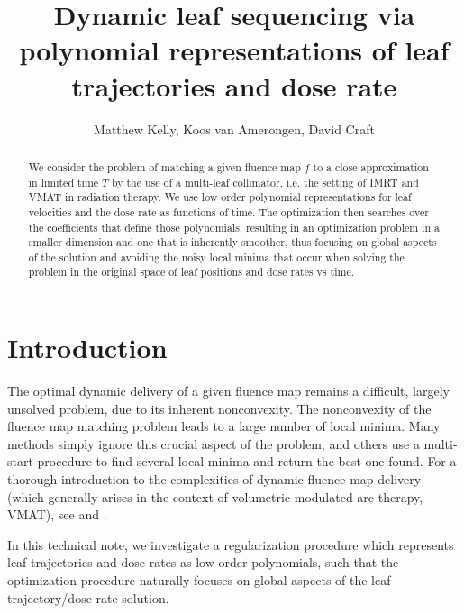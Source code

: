 \documentclass[12pt]{article}
\title{Dynamic leaf sequencing via polynomial representations of leaf trajectories and dose rate}
\author{Matthew Kelly, Koos van Amerongen, David Craft}
\affil[]{Department of Radiation Oncology, Massachusetts General Hospital, Harvard Medical School}
\begin{document}
\maketitle
\thispagestyle{empty}



\begin{abstract}
  We consider the problem of matching a given fluence map $f$ to a close approximation in limited time $T$ by the use
  of a multi-leaf collimator, i.e. the setting of IMRT and VMAT in radiation therapy. We use low order polynomial 
  representations for leaf velocities and the dose rate as functions of time. The optimization then searches over the coefficients
  that define those polynomials, resulting in an optimization problem in a smaller dimension and one that is inherently smoother,
  thus focusing on global aspects of the solution and avoiding the noisy local minima that occur when solving the problem in the original
  space of leaf positions and dose rates vs time.
\end{abstract}

\section{Introduction}
The optimal dynamic delivery of a given fluence map remains a difficult, largely unsolved problem, due to its inherent nonconvexity.
The nonconvexity of the fluence map matching problem leads to a large number of local minima. Many methods simply ignore this crucial aspect
of the problem, and others use a multi-start procedure to find several local minima and return the best one found. For a thorough introduction
to the complexities of dynamic fluence map delivery (which generally arises in the context of volumetric modulated arc therapy, VMAT),
see \cite{balvertcraft} and \cite{unkvmatreview}.

In this technical note, we investigate a regularization procedure which represents leaf trajectories and dose rates as low-order polynomials,
such that the optimization procedure naturally focuses on global aspects of the leaf trajectory/dose rate solution.
\end{document}
